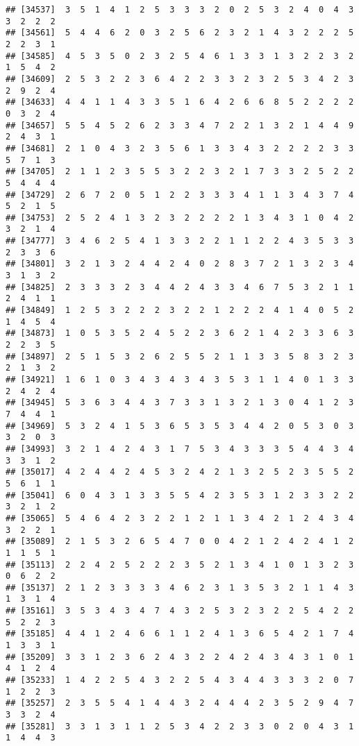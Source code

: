\documentclass[
]{article}
\begin{document}
\begin{verbatim}
## [34537]  3  5  1  4  1  2  5  3  3  3  2  0  2  5  3  2  4  0  4  3  3  2  2  2
## [34561]  5  4  4  6  2  0  3  2  5  6  2  3  2  1  4  3  2  2  2  5  2  2  3  1
## [34585]  4  5  3  5  0  2  3  2  5  4  6  1  3  3  1  3  2  2  3  2  1  5  4  2
## [34609]  2  5  3  2  2  3  6  4  2  2  3  3  2  3  2  5  3  4  2  3  2  9  2  4
## [34633]  4  4  1  1  4  3  3  5  1  6  4  2  6  6  8  5  2  2  2  2  0  3  2  4
## [34657]  5  5  4  5  2  6  2  3  3  4  7  2  2  1  3  2  1  4  4  9  2  4  3  1
## [34681]  2  1  0  4  3  2  3  5  6  1  3  3  4  3  2  2  2  2  3  3  5  7  1  3
## [34705]  2  1  1  2  3  5  5  3  2  2  3  2  1  7  3  3  2  5  2  2  5  4  4  4
## [34729]  2  6  7  2  0  5  1  2  2  3  3  3  4  1  1  3  4  3  7  4  5  2  1  5
## [34753]  2  5  2  4  1  3  2  3  2  2  2  2  1  3  4  3  1  0  4  2  3  2  1  4
## [34777]  3  4  6  2  5  4  1  3  3  2  2  1  1  2  2  4  3  5  3  3  2  3  3  6
## [34801]  3  2  1  3  2  4  4  2  4  0  2  8  3  7  2  1  3  2  3  4  3  1  3  2
## [34825]  2  3  3  3  2  3  4  4  2  4  3  3  4  6  7  5  3  2  1  1  2  4  1  1
## [34849]  1  2  5  3  2  2  2  3  2  2  1  2  2  2  4  1  4  0  5  2  1  4  5  4
## [34873]  1  0  5  3  5  2  4  5  2  2  3  6  2  1  4  2  3  3  6  3  2  2  3  5
## [34897]  2  5  1  5  3  2  6  2  5  5  2  1  1  3  3  5  8  3  2  3  2  1  3  2
## [34921]  1  6  1  0  3  4  3  4  3  4  3  5  3  1  1  4  0  1  3  3  2  4  2  4
## [34945]  5  3  6  3  4  4  3  7  3  3  1  3  2  1  3  0  4  1  2  3  7  4  4  1
## [34969]  5  3  2  4  1  5  3  6  5  3  5  3  4  4  2  0  5  3  0  3  3  2  0  3
## [34993]  3  2  1  4  2  4  3  1  7  5  3  4  3  3  3  5  4  4  3  4  3  3  1  2
## [35017]  4  2  4  4  2  4  5  3  2  4  2  1  3  2  5  2  3  5  5  2  5  6  1  1
## [35041]  6  0  4  3  1  3  3  5  5  4  2  3  5  3  1  2  3  3  2  2  3  2  1  2
## [35065]  5  4  6  4  2  3  2  2  1  2  1  1  3  4  2  1  2  4  3  4  3  2  2  1
## [35089]  2  1  5  3  2  6  5  4  7  0  0  4  2  1  2  4  2  4  1  2  1  1  5  1
## [35113]  2  2  4  2  5  2  2  2  3  5  2  1  3  4  1  0  1  3  2  3  0  6  2  2
## [35137]  2  1  2  3  3  3  3  4  6  2  3  1  3  5  3  2  1  1  4  3  1  3  1  4
## [35161]  3  5  3  4  3  4  7  4  3  2  5  3  2  3  2  2  5  4  2  2  5  2  2  3
## [35185]  4  4  1  2  4  6  6  1  1  2  4  1  3  6  5  4  2  1  7  4  1  3  3  1
## [35209]  3  3  1  2  3  6  2  4  3  2  2  4  2  4  3  4  3  1  0  1  4  1  2  4
## [35233]  1  4  2  2  5  4  3  2  2  5  4  3  4  4  3  3  3  2  0  7  1  2  2  3
## [35257]  2  3  5  5  4  1  4  4  3  2  4  4  4  2  3  5  2  9  4  7  3  3  2  4
## [35281]  3  3  1  3  1  1  2  5  3  4  2  2  3  3  0  2  0  4  3  1  1  4  4  3

\end{verbatim}
\end{document}
